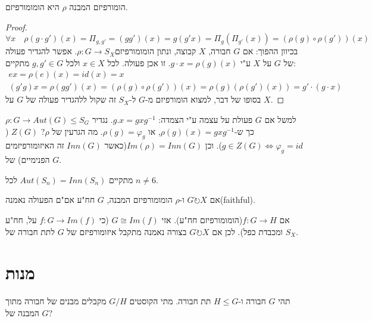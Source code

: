 \documentclass{tstextbook}
\begin{document}
\begin{proposition}
הומורפיזם המבנה \(\rho\) היא הומומורפיזם.

\end{proposition}
\begin{proof}
$$\forall x\quad  \rho\left( g\cdot g' \right)(x)=\Pi_{g,g'}=(gg')(x)=g(g'x)=\Pi_{g}\left( \Pi_{g'}(x) \right)=\left( \rho(g) \circ  \rho(g') \right)(x)$$
בכיוון ההפוך: אם \(G\) חבורה, \(X\) קבוצה, ונתון הומומורפיזם\(\rho:G\to S_{X}\). אפשר להגדיר פעולה של \(G\) על \(X\) ע"י \(g\cdot x=\rho(g)(x)\). זו אכן פעולה. לכל \(x \in X\) ולכל \(g,g'\in G\) מתקיים: 
$$\begin{gathered}e x=\rho(e)(x)=id(x)=x \\(g'g)x= \rho(gg')(x)=\left( \rho(g)\circ \rho(g') \right)(x)=\rho(g)\left( \rho(g')(x) \right)=g'\cdot \left( g\cdot x \right)
\end{gathered}$$ בסופו של דבר, למצוא הומורפיזם מ-\(G\) ל-\(S_{X}\) זה שקול ללהגדיר פעולה של \(G\) על \(X\).

\end{proof}
\begin{example}
למשל אם \(G\) פעולת על עצמה ע"י הצמדה: \(g.x=gxg^{-1}\). נגדיר \(\rho:G\to Aut(G)\leq S_{G}\) כך ש-\(\rho(g)(x)=gxg^{-1}\), או \(\rho(g)=\varphi_{g}\). מה הגרעין של \(\rho\)? \(Z(G)\) (\(g\in Z(G)\iff \varphi_{g}=id\)).
וכן \(Im\left( \rho \right)=Inn(G)\)(כאשר \(Inn(G)\) זה האיזומורפיזמים הפנימיים) של \(G\).

\end{example}
\begin{remark}
מתקיים \(Aut(S_{n})=Inn(S_{n})\) לכל \(n\neq 6\).

\end{remark}
\begin{remark}
אם \(G\circlearrowright X\) ו-\(\rho\) הומומורפיזם המבנה, \(G\) חח"ע אם"ם הפעולה נאמנה(faithful).

\end{remark}
\begin{remark}
אם \(f:G\to H\)(הומומורפיזם חח"ע). אזי \(G\cong Im(f)\) (כי \(f:G\to Im(f)\) על, חח"ע ומכבדת כפל). לכן אם \(G\circlearrowright X\) בצורה נאמנה מתקבל איזומורפיזם של \(G\) לתת חבורה של \(S_{X}\).

\end{remark}
\section{מנות}

תהי \(G\) חבורה ו-\(H\leq G\) תת חבורה. מתי הקוסטים \(G/H\) מקבלים מבנים של חבורה מתוך המבנה של \(G\)?
\end{document}
